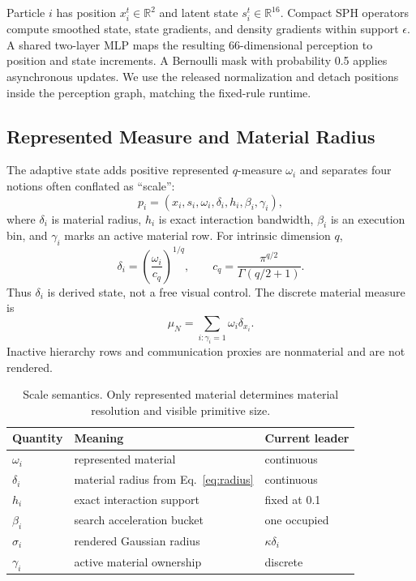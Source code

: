 \documentclass[sigconf,nonacm]{acmart}
\begin{document}
Particle $i$ has position $x_i^t\in\mathbb{R}^2$ and latent state
$s_i^t\in\mathbb{R}^{16}$. Compact SPH operators compute smoothed state,
state gradients, and density gradients within support $\epsilon$. A shared
two-layer MLP maps the resulting 66-dimensional perception to position and
state increments. A Bernoulli mask with probability 0.5 applies asynchronous
updates. We use the released normalization and detach positions inside the
perception graph, matching the fixed-rule runtime.

\subsection{Represented Measure and Material Radius}

The adaptive state adds positive represented $q$-measure $\omega_i$ and
separates four notions often conflated as ``scale'':
\begin{equation}
  p_i = (x_i,s_i,\omega_i,\delta_i,h_i,\beta_i,\gamma_i),
\end{equation}
where $\delta_i$ is material radius, $h_i$ is exact interaction bandwidth,
$\beta_i$ is an execution bin, and $\gamma_i$ marks an active material row.
For intrinsic dimension $q$,
\begin{equation}
  \delta_i = \left(\frac{\omega_i}{c_q}\right)^{1/q},
  \qquad c_q=\frac{\pi^{q/2}}{\Gamma(q/2+1)}.
  \label{eq:radius}
\end{equation}
Thus $\delta_i$ is derived state, not a free visual control. The discrete
material measure is
\begin{equation}
  \mu_N = \sum_{i:\gamma_i=1}\omega_i\delta_{x_i}.
\end{equation}
Inactive hierarchy rows and communication proxies are nonmaterial and are not
rendered.

\begin{table}[t]
\caption{Scale semantics. Only represented material determines material
resolution and visible primitive size.}
\label{tab:semantics}
\centering
\small
\begin{tabular}{lll}
\toprule
Quantity & Meaning & Current leader \\
\midrule
$\omega_i$ & represented material & continuous \\
$\delta_i$ & material radius from Eq.~\ref{eq:radius} & continuous \\
$h_i$ & exact interaction support & fixed at 0.1 \\
$\beta_i$ & search acceleration bucket & one occupied \\
$\sigma_i$ & rendered Gaussian radius & $\kappa\delta_i$ \\
$\gamma_i$ & active material ownership & discrete \\
\bottomrule
\end{tabular}
\end{table}
\end{document}
